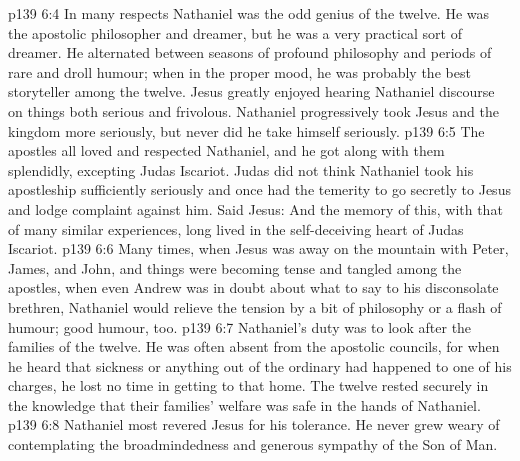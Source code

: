 \vs p139 6:4 In many respects Nathaniel was the odd genius of the twelve. He was the apostolic philosopher and dreamer, but he was a very practical sort of dreamer. He alternated between seasons of profound philosophy and periods of rare and droll humour; when in the proper mood, he was probably the best storyteller among the twelve. Jesus greatly enjoyed hearing Nathaniel discourse on things both serious and frivolous. Nathaniel progressively took Jesus and the kingdom more seriously, but never did he take himself seriously.
\vs p139 6:5 The apostles all loved and respected Nathaniel, and he got along with them splendidly, excepting Judas Iscariot. Judas did not think Nathaniel took his apostleship sufficiently seriously and once had the temerity to go secretly to Jesus and lodge complaint against him. Said Jesus:  And the memory of this, with that of many similar experiences, long lived in the self\hyp{}deceiving heart of Judas Iscariot.
\vs p139 6:6 Many times, when Jesus was away on the mountain with Peter, James, and John, and things were becoming tense and tangled among the apostles, when even Andrew was in doubt about what to say to his disconsolate brethren, Nathaniel would relieve the tension by a bit of philosophy or a flash of humour; good humour, too.
\vs p139 6:7 Nathaniel’s duty was to look after the families of the twelve. He was often absent from the apostolic councils, for when he heard that sickness or anything out of the ordinary had happened to one of his charges, he lost no time in getting to that home. The twelve rested securely in the knowledge that their families’ welfare was safe in the hands of Nathaniel.
\vs p139 6:8 \pc Nathaniel most revered Jesus for his tolerance. He never grew weary of contemplating the broadmindedness and generous sympathy of the Son of Man.
